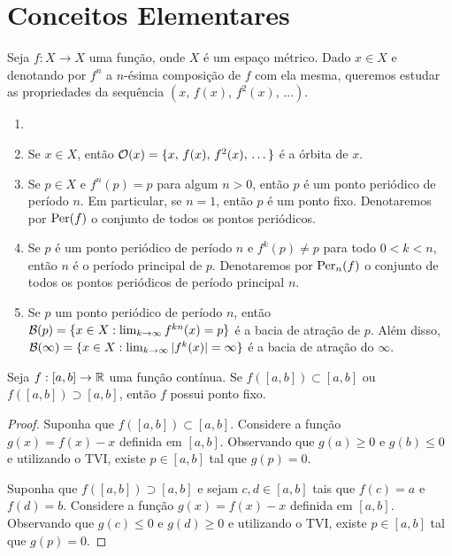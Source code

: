 \section{Conceitos Elementares}

Seja $f: X \to X$ uma função, onde $X$ é um espaço métrico.
Dado $x \in X$ e denotando por $f^n$ a $n$-ésima composição de $f$ com ela mesma, queremos estudar as propriedades da sequência $(x, \, f(x), \, f^2(x), \, \dots)$.

\begin{definition}
\begin{enumerate}[label=\alph*.]\item[]
\item Se $x \in X$, então $\mathcal{O}(x) = \lbrace x, \, f(x), \, f^2(x), \, \dots \rbrace$ é a órbita de $x$.
\item Se $p \in X$ e $f^n(p) = p$ para algum $n > 0$, então $p$ é um ponto periódico de período $n$. Em particular, se $n = 1$, então $p$ é um ponto fixo. Denotaremos por $\operatorname{Per}(f)$ o conjunto de todos os pontos periódicos.
\item Se $p$ é um ponto periódico de período $n$ e $f^k(p) \neq p$ para todo $0 < k < n$, então $n$ é o período principal de $p$. Denotaremos por $\operatorname{Per}_n(f)$ o conjunto de todos os pontos periódicos de período principal $n$.
\item Se $p$ um ponto periódico de período $n$, então $\mathcal{B}(p) = \lbrace x \in  X: \lim_{k \to \infty} f^{kn}(x) = p \rbrace$ é a bacia de atração de $p$. Além disso, $\mathcal{B}(\infty) = \lbrace x \in  X: \lim_{k \to \infty} |f^k(x)| = \infty \rbrace$ é a bacia de atração do $\infty$.
\end{enumerate}
\end{definition}

\begin{proposition}
Seja $f: [a, b] \to \mathbb{R}$ uma função contínua. Se $f([a, b]) \subset [a, b]$ ou $f([a, b]) \supset [a, b]$, então $f$ possui ponto fixo.
\end{proposition}

\begin{proof}
Suponha que $f([a, b]) \subset [a, b]$. Considere a função $g(x) = f(x) - x$ definida em $[a, b]$. Observando que $g(a) \geq 0$ e $g(b) \leq 0$ e utilizando o TVI, existe $p \in [a, b]$ tal que $g(p) = 0$.

Suponha que $f([a, b]) \supset [a, b]$ e sejam $c, d \in [a, b]$ tais que $f(c) = a$ e $f(d) = b$. Considere a função $g(x) = f(x) - x$ definida em $[a, b]$. Observando que $g(c) \leq 0$ e $g(d) \geq 0$ e utilizando o TVI, existe $p \in [a, b]$ tal que $g(p) = 0$.
\end{proof}

